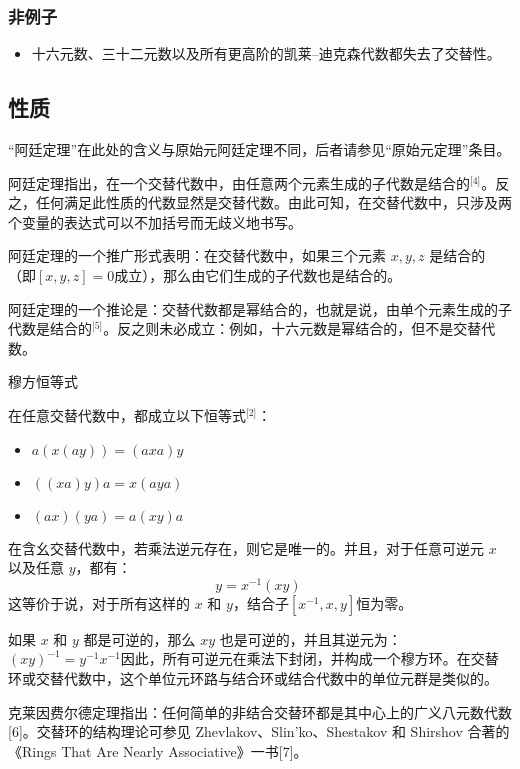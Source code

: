 \subsubsection{非例子}
\begin{itemize}
\item 十六元数、三十二元数以及所有更高阶的凯莱–迪克森代数都失去了交替性。
\end{itemize}
\subsection{性质}
“阿廷定理”在此处的含义与原始元阿廷定理不同，后者请参见“原始元定理”条目。

阿廷定理指出，在一个交替代数中，由任意两个元素生成的子代数是结合的\(^\text{[4]}\)。反之，任何满足此性质的代数显然是交替代数。由此可知，在交替代数中，只涉及两个变量的表达式可以不加括号而无歧义地书写。

阿廷定理的一个推广形式表明：在交替代数中，如果三个元素 $x, y, z$ 是结合的（即$
[x, y, z] = 0$成立），那么由它们生成的子代数也是结合的。

阿廷定理的一个推论是：交替代数都是幂结合的，也就是说，由单个元素生成的子代数是结合的\(^\text{[5]}\)。反之则未必成立：例如，十六元数是幂结合的，但不是交替代数。

穆方恒等式

在任意交替代数中，都成立以下恒等式\(^\text{[2]}\)：
\begin{itemize}
\item $a(x(ay)) = (axa)y$
\item $((xa)y)a = x(aya)$
\item $(ax)(ya) = a(xy)a$
\end{itemize}
在含幺交替代数中，若乘法逆元存在，则它是唯一的。并且，对于任意可逆元 $x$ 以及任意 $y$，都有：
$$
y = x^{-1}(xy)~
$$
这等价于说，对于所有这样的 $x$ 和 $y$，结合子$[x^{-1}, x, y]$恒为零。

如果 $x$ 和 $y$ 都是可逆的，那么 $xy$ 也是可逆的，并且其逆元为：$(xy)^{-1} = y^{-1}x^{-1}$因此，所有可逆元在乘法下封闭，并构成一个穆方环。在交替环或交替代数中，这个单位元环路与结合环或结合代数中的单位元群是类似的。

克莱因费尔德定理指出：任何简单的非结合交替环都是其中心上的广义八元数代数[6]。交替环的结构理论可参见 Zhevlakov、Slin'ko、Shestakov 和 Shirshov 合著的《Rings That Are Nearly Associative》一书[7]。
